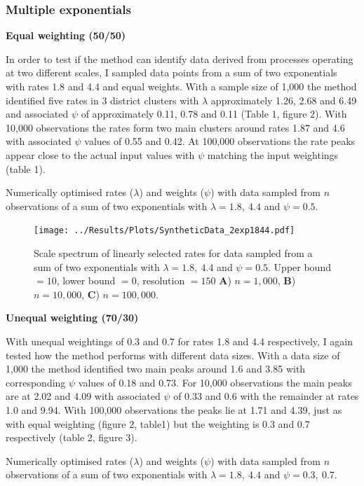 \documentclass[11pt,usenames,dvipsnames,a4paper]{article}
\begin{document}
\subsubsection{Multiple exponentials}

\noindent
\textbf{Equal weighting (50/50)}
\begin{linenumbers}
	
In order to test if the method can identify data derived from processes operating at two different scales, I sampled data points from a sum of two exponentials with rates 1.8 and 4.4 and equal weights. With a sample size of 1,000 the method identified five rates in 3 district clusters with $\lambda$ approximately 1.26, 2.68 and 6.49 and associated $\psi$ of approximately 0.11, 0.78 and 0.11 (Table 1, figure 2). With 10,000 observations the rates form two main clusters around rates 1.87 and 4.6 with associated $\psi$ values of 0.55 and 0.42. At 100,000 observations the rate peaks appear close to the actual input values with $\psi$ matching the input weightings (table 1).
\end{linenumbers}

\begin{table}[H]
	\centering
	\caption{Numerically optimised rates ($\lambda$) and weights ($\psi$) with data sampled from $n$ observations of a sum of two exponentials with $\lambda = 1.8,\ 4.4$ and $\psi = 0.5$.}
	
\end{table}


\begin{figure}[H]
	\centering
	\texttt{[image: ../Results/Plots/SyntheticData\_2exp1844.pdf]}
	\caption{Scale spectrum of linearly selected rates for data sampled from a sum of two exponentials with $\lambda = 1.8,\ 4.4$ and $\psi = 0.5$. Upper bound $= 10$, lower bound $= 0$, resolution $= 150$ \textbf{A}) $n = 1,000$, \textbf{B}) $n = 10,000$,  \textbf{C}) $n = 100,000$.}
\end{figure}

\noindent
\textbf{Unequal weighting (70/30)}
\begin{linenumbers}

With unequal weightings of 0.3 and 0.7 for rates 1.8 and 4.4 respectively, I again tested how the method performs with different data sizes. With a data size of 1,000 the method identified two main peaks around 1.6 and 3.85 with corresponding $\psi$ values of 0.18 and 0.73. For 10,000 observations the main peaks are at 2.02 and 4.09 with associated $\psi$ of 0.33 and 0.6 with the remainder at rates 1.0 and 9.94. With 100,000 observations the peaks lie at 1.71 and 4.39, just as with equal weighting (figure 2, table1) but the weighting is 0.3 and 0.7 respectively (table 2, figure 3).
\end{linenumbers}
\begin{table}[H]
	\centering
	\caption{Numerically optimised rates ($\lambda$) and weights ($\psi$) with data sampled from $n$ observations of a sum of two exponentials with $\lambda = 1.8,\ 4.4$ and $\psi = 0.3,\ 0.7$.}
	
\end{table}
\end{document}
